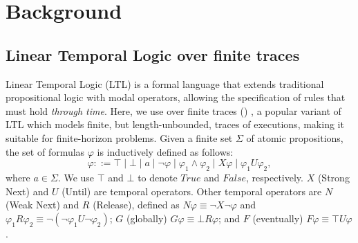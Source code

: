 \section{Background}
\subsection{Linear Temporal Logic over finite traces}
\label{sec:ltlf}

Linear Temporal Logic (LTL) \cite{LTL} is a formal language that extends traditional propositional logic with modal operators, allowing the specification of rules that must hold \textit{through time}. Here, we use \ltl over finite traces (\ltlf) \cite{LTLf}, a popular variant of LTL which models finite, but length-unbounded, traces of executions, making it suitable for finite-horizon problems.
Given a finite set $\Sigma$ of atomic propositions, the set of \ltlf formulas $\varphi$ is inductively defined as follows:
\[
    \varphi ::= \top \mid
    \bot
    \mid 
    a
    \mid
    \lnot\varphi
    \mid
    \varphi_1\land\varphi_2
    \mid
    X\varphi
    \mid
    \varphi_1 U\varphi_2,
\]
where $a \in \Sigma$. We use $\top$ and $\bot$ to denote $True$ and $False$, respectively. $X$ (Strong Next) and $U$ (Until) are temporal operators. Other temporal operators are $N$ (Weak Next) and $R$ (Release), defined as $N \varphi \equiv \neg X\neg\varphi$ and $\varphi_1 R \varphi_2 \equiv \neg(\neg\varphi_1 U \neg\varphi_2 )$; $G$ (globally) $G\varphi \equiv \bot R\varphi$; and $F$ (eventually) $F \varphi \equiv \top U \varphi$.

